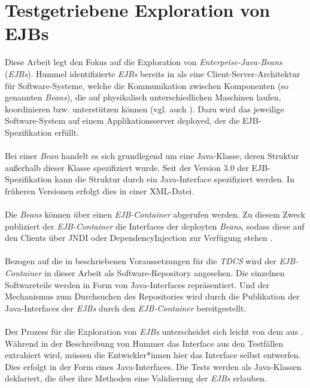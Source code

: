 \section{Testgetriebene Exploration von EJBs}\label{sec_tdcs_ejb}
Diese Arbeit legt den Fokus auf die Exploration von \emph{Enterprise-Java-Beans} (\emph{EJBs}). Hummel identifizierte \emph{EJBs} bereits in \cite{hummel08} als eine Client-Server-Architektur für Software-Systeme, welche die Kommunikation zwischen Komponenten (so genannten \emph{Beans}), die auf physikalisch unterschiedlichen Maschinen laufen, koordinieren bzw. unterstützen können (vgl. auch \cite{ejbspec}). Dazu wird das jeweilige Software-System auf einem Applikationsserver deployed, der die EJB-Spezifikation \cite{ejbspec} erfüllt.
\\\\
Bei einer \emph{Bean} handelt es sich grundlegend um eine Java-Klasse, deren Struktur außerhalb dieser Klasse spezifiziert wurde. Seit der Version 3.0 der EJB-Spezifikation kann die Struktur durch ein Java-Interface spezifiziert werden. In früheren Versionen erfolgt dies in einer XML-Datei. \cite{ejbspec}
\\\\
Die \emph{Beans} können über einen \emph{EJB-Container} abgerufen werden. Zu diesem Zweck publiziert der \emph{EJB-Container} die \Gls{Interface}s der deployten \emph{Beans}, sodass diese auf den Clients über \Gls{JNDI} oder \Gls{DependencyInjection} zur Verfügung stehen \cite{ejbspec}.
\\\\
Bezogen auf die in \cite{hummel08} beschriebenen Voraussetzungen für die \emph{TDCS} wird der \emph{EJB-Container} in dieser Arbeit als Software-Repository angesehen. Die einzelnen Softwareteile werden in Form von Java-Interfaces repräsentiert. Und der Mechanismus zum Durchsuchen des Repositories wird durch die Publikation der Java-Interfaces der \emph{EJBs} durch den \emph{EJB-Container} bereitgestellt.
\\\\
Der Prozess für die Exploration von \emph{EJBs} unterscheidet sich leicht von dem aus . Während in der Beschreibung von Hummer das \Gls{Interface} aus den Testfällen extrahiert wird, müssen die Entwickler*innen hier das \Gls{Interface} selbst entwerfen. Dies erfolgt in der Form eines Java-Interfaces. Die Tests werden als Java-Klassen deklariert, die über ihre Methoden eine Validierung der \emph{EJBs} erlauben.
\\\\
